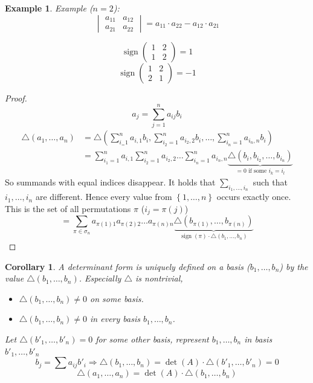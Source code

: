 \documentclass[a4paper,landscape,twocolumn]{article}
\newcommand\set[1]{\left\{#1\right\}}
\newtheorem{ex}{Example}
\newtheorem{cor}{Corollary}
\DeclareMathOperator\sign{sign}
\begin{document}
%
\begin{ex}
  Example ($n=2$):
  \[
    \begin{vmatrix}
      a_{11} & a_{12} \\
      a_{21} & a_{22}
    \end{vmatrix}
    = a_{11} \cdot a_{22} - a_{12} \cdot a_{21}
  \]

  \[ \sign\begin{pmatrix} 1 & 2 \\ 1 & 2 \end{pmatrix} = 1 \]
  \[ \sign\begin{pmatrix} 1 & 2 \\ 2 & 1 \end{pmatrix} = -1 \]
\end{ex}
%
\begin{proof}
  \[ a_j = \sum_{j=1}^n a_{ij} b_i \]
  \begin{align*}
    \triangle(a_1, \ldots, a_n) &= \triangle\left(\sum_{i_=1}^n a_{i,1} b_i, \sum_{i_2=1}^n a_{i_2,2} b_i, \ldots, \sum_{i_n=1}^n a_{i_n,n} b_i\right) \\
      &= \sum_{i_1=1}^n a_{i,1} \sum_{i_2=1}^n a_{i_2,2} \ldots \sum_{i_n=1}^n a_{i_n,n} \underbrace{\triangle (b_i, b_{i_2}, \ldots, b_{i_n})}_{= 0 \text{ if some } i_k = i_l}
  \end{align*}
  So summands with equal indices disappear. It holds that
  $\sum_{i_1, \ldots, i_n}$ such that $i_1, \ldots, i_n$ are different.
  Hence every value from $\set{1, \ldots, n}$ occurs exactly once.
  This is the set of all permutations $\pi$ ($i_j = \pi(j)$)
  \[ = \sum_{\pi \in \sigma_n} a_{\pi(1) 1} a_{\pi(2) 2} \ldots a_{\pi(n) n} \underbrace{\triangle(b_{\pi(1)}, \ldots, b_{\pi(n)})}_{\sign(\pi) \cdot \triangle(b_1,\ldots,b_n)} \]
\end{proof}
\begin{cor}
  \label{cor-7.21}
  A determinant form is \emph{uniquely} defined on a basis ($b_1, \ldots, b_n$) by the value $\triangle(b_1, \ldots, b_n)$.
  Especially $\triangle$ is nontrivial,
  \begin{itemize}
    \item[$\Leftrightarrow$] $\triangle (b_1, \ldots, b_n) \neq 0$ on some basis.
    \item[$\Leftrightarrow$] $\triangle (b_1, \ldots, b_n) \neq 0$ in every basis $b_1, \ldots, b_n$.
  \end{itemize}

  Let $\triangle(b'_1, \ldots, b'_n) = 0$ for some other basis, represent $b_1, \ldots, b_n$ in basis $b'_1, \ldots, b'_n$
  \[ b_j = \sum a_{ij} b'_i \Rightarrow \triangle(b_1, \ldots, b_n) = \det(A) \cdot \triangle(b'_1, \ldots, b'_n) = 0 \]
  \[ \triangle(a_1, \ldots, a_n) = \det(A) \cdot \triangle(b_1, \ldots, b_n) \]
\end{cor}
\end{document}

